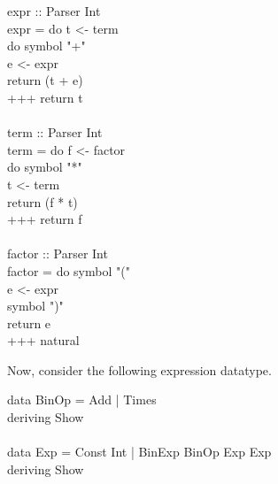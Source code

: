\documentclass[11pt]{article}
\begin{document}
\begin{program*}
\>  expr :: Parser Int  \\
\>  expr = do t <- term  \\
\>            do symbol "+"  \\
\>               e <- expr  \\
\>               return (t + e)  \\
\>              +++ return t  \\
\>    \\
\>  term :: Parser Int  \\
\>  term = do f <- factor  \\
\>            do symbol "*"  \\
\>               t <- term   \\
\>               return (f * t)  \\
\>              +++ return f  \\
\>    \\
\>  factor :: Parser Int  \\
\>  factor = do symbol "("  \\
\>              e <- expr  \\
\>              symbol ")"  \\
\>              return e  \\
\>             +++ natural  \\
\end{program*}

Now, consider the following expression datatype.

\begin{program*}
\> data BinOp = Add | Times \\
\>    deriving Show \\
\>  \\
\> data Exp = Const Int | BinExp BinOp Exp Exp  \\
\>    deriving Show  \\
\>  \\
\end{program*}
\end{document}
